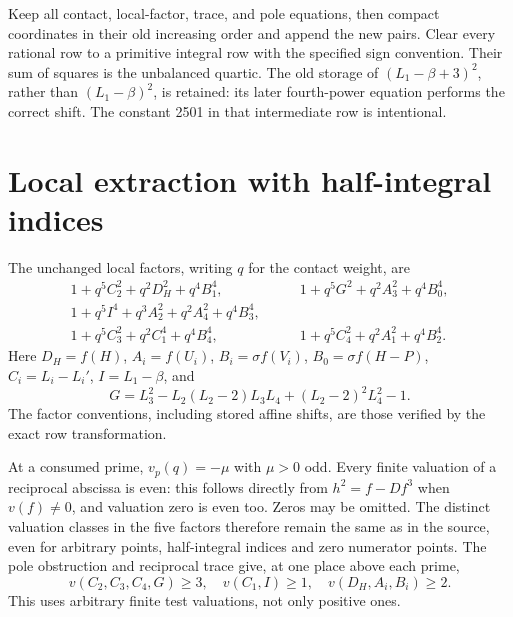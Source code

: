 \documentclass[11pt,a4paper]{article}
\begin{document}
Keep all contact, local-factor, trace, and pole equations, then compact
coordinates in their old increasing order and append the new pairs.
Clear every rational row to a primitive integral row with the specified
sign convention. Their sum of squares is the unbalanced quartic.
The old storage of $(L_1-\beta+3)^2$, rather than $(L_1-\beta)^2$,
is retained: its later fourth-power equation performs the correct
shift. The constant 2501 in that intermediate row is intentional.

\section{Local extraction with half-integral indices}
The unchanged local factors, writing $q$ for the contact weight, are
\begin{align*}
1+q^5C_2^2+q^2D_H^2+q^4B_1^4,&\qquad
1+q^5G^2+q^2A_3^2+q^4B_0^4,\\
1+q^5I^4+q^3A_2^2+q^2A_4^2+q^4B_3^4,&\\
1+q^5C_3^2+q^2C_1^4+q^4B_4^4,&\qquad
1+q^5C_4^2+q^2A_1^2+q^4B_2^4.
\end{align*}
Here $D_H=f(H)$, $A_i=f(U_i)$, $B_i=\sigma f(V_i)$,
$B_0=\sigma f(H-P)$, $C_i=L_i-L_i'$, $I=L_1-\beta$, and
\[
 G=L_3^2-L_2(L_2-2)L_3L_4+(L_2-2)^2L_4^2-1.
\]
The factor conventions, including stored affine shifts, are those
verified by the exact row transformation.

At a consumed prime, $v_p(q)=-\mu$ with $\mu>0$ odd. Every finite
valuation of a reciprocal abscissa is even: this follows directly
from $h^2=f-Df^3$ when $v(f)\ne0$, and valuation zero is even too.
Zeros may be omitted. The distinct valuation classes in the five
factors therefore remain the same as in the source, even for arbitrary
points, half-integral indices and zero numerator points. The pole
obstruction and reciprocal trace give, at one place above each prime,
\[
 v(C_2,C_3,C_4,G)\ge3,\quad v(C_1,I)\ge1,
 \quad v(D_H,A_i,B_i)\ge2.
\]
This uses arbitrary finite test valuations, not only positive ones.
\end{document}
